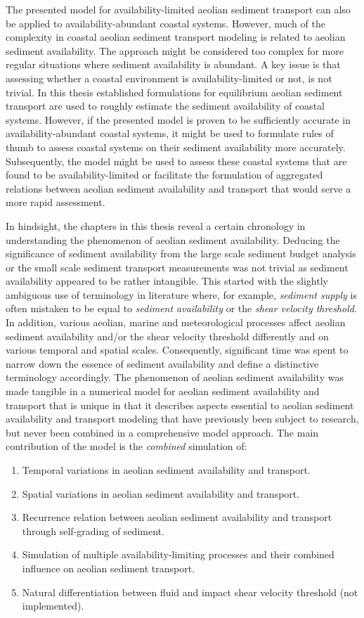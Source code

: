 The presented model for availability-limited aeolian sediment
transport can also be applied to availability-abundant coastal
systems. However, much of the complexity in coastal aeolian sediment
transport modeling is related to aeolian sediment availability. The
approach might be considered too complex for more regular situations
where sediment availability is abundant. A key issue is that assessing
whether a coastal environment is availability-limited or not, is not
trivial. In this thesis established formulations for equilibrium
aeolian sediment transport are used to roughly estimate the sediment
availability of coastal systems. However, if the presented model is
proven to be sufficiently accurate in availability-abundant coastal
systems, it might be used to formulate rules of thumb to assess
coastal systems on their sediment availability more
accurately. Subsequently, the model might be used to assess these
coastal systems that are found to be availability-limited or
facilitate the formulation of aggregated relations between aeolian
sediment availability and transport that would serve a more rapid
assessment.

In hindsight, the chapters in this thesis reveal a certain chronology
in understanding the phenomenon of aeolian sediment availability.
Deducing the significance of sediment availability from the large
scale sediment budget analysis or the small scale sediment transport
measurements was not trivial as sediment availability appeared to be
rather intangible. This started with the slightly ambiguous use of
terminology in literature where, for example, \emph{sediment supply}
is often mistaken to be equal to \emph{sediment availability} or the
\emph{shear velocity threshold}. In addition, various aeolian, marine
and meteorological processes affect aeolian sediment availability
and/or the shear velocity threshold differently and on various
temporal and spatial scales. Consequently, significant time was spent
to narrow down the essence of sediment availability and define a
distinctive terminology accordingly. The phenomenon of aeolian
sediment availability was made tangible in a numerical model for
aeolian sediment availability and transport that is unique in that it
describes aspects essential to aeolian sediment availability and
transport modeling that have previously been subject to research, but
never been combined in a comprehensive model approach. The main
contribution of the model is the \emph{combined} simulation of:

\begin{enumerate}
\item Temporal variations in aeolian sediment availability and
  transport.
\item Spatial variations in aeolian sediment availability and
  transport.
\item Recurrence relation between aeolian sediment availability and
  transport through self-grading of sediment.
\item Simulation of multiple availability-limiting processes and their
  combined influence on aeolian sediment transport.
\item Natural differentiation between fluid and impact shear velocity
  threshold (not implemented).
\end{enumerate}

